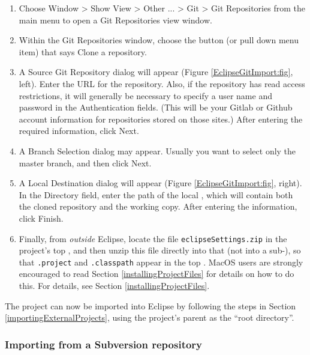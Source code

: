 \begin{enumerate}

\item Choose {\sf Window > Show View > Other ... > Git > Git Repositories} 
from the main menu to open a {\sf Git Repositories} view window.

\item Within the {\sf Git Repositories} window, choose the
button (or pull down menu item) that says {\sf Clone a repository}.

\item 
A {\sf Source Git Repository} dialog will appear (Figure
\ref{EclipseGitImport:fig}, left). Enter the URL for the
repository. Also, if the repository has read access restrictions, it
will generally be necessary to specify a user name and password in the
{\sf Authentication} fields.  (This will be your Gitlab or Github
account information for repositories stored on those sites.)  After
entering the required information, click {\sf Next}.

\item A {\sf Branch Selection} dialog may appear. Usually
you want to select only the {\sf master} branch, and then click {\sf
Next}.

\item A {\sf Local Destination} dialog will appear (Figure
\ref{EclipseGitImport:fig}, right). In the {\sf Directory} field, enter
the path of the local \directory{}, which will contain both the cloned
repository and the working copy. After entering the \directory{}
information, click {\sf Finish}.

\item Finally, from {\it outside} Eclipse, locate the file
{\tt eclipseSettings.zip} in the project's top \directory{}, and then
unzip this file directly into that \directory{} (not into a
sub-\directory{}), so that {\tt .project} and {\tt .classpath} appear
in the top \directory{}.
\ifMacOS
MacOS users are strongly encouraged to read  
Section \ref{installingProjectFiles} for details on how to do this.
\else
For details, see Section \ref{installingProjectFiles}.
\fi %

\end{enumerate}

The project can now be imported into Eclipse by following the steps in
Section \ref{importingExternalProjects}, using the project's
parent \directory{} as the ``root directory''.

\subsubsection{Importing from a Subversion repository}
\label{importingFromSubversion}

